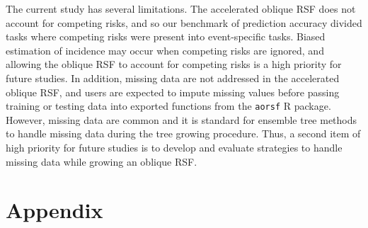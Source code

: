 \documentclass[twoside,11pt]{article}\usepackage[]{graphicx}\usepackage[]{xcolor}
\begin{document}
The current study has several limitations. The accelerated oblique RSF does not account for competing risks, and so our benchmark of prediction accuracy divided tasks where competing risks were present into event-specific tasks. Biased estimation of incidence may occur when competing risks are ignored, and allowing the oblique RSF to account for competing risks is a high priority for future studies. In addition, missing data are not addressed in the accelerated oblique RSF, and users are expected to impute missing values before passing training or testing data into exported functions from the \texttt{aorsf} R package. However, missing data are common and it is standard for ensemble tree methods to handle missing data during the tree growing procedure. Thus, a second item of high priority for future studies is to develop and evaluate strategies to handle missing data while growing an oblique RSF.




\newpage

\appendix

\section*{Appendix}
\captionsetup{labelformat=AppendixTables}
\setcounter{table}{0}
\end{document}
